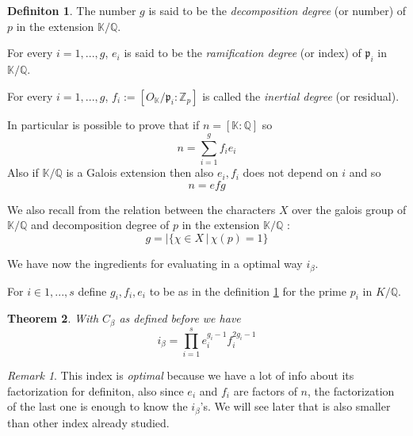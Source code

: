 \documentclass[]{article}
\theoremstyle{plain}
\newtheorem{teo}{Theorem}[section]
\theoremstyle{remark}
\newtheorem{rem}{Remark}
\theoremstyle{definition}
\newtheorem{deff}[teo]{Definiton}
\newcommand{\Z}{\mathbb{Z}}
\newcommand{\K}{\mathbb{K}}
\newcommand{\Q}{\mathbb{Q}}
\begin{document}
	\begin{deff} \label{def:degree}
		The number $ g $ is said to be the \textit{decomposition degree} (or number) of $ p $ in the extension $ \K / \Q $.
		
		For every $ i=1, ..., g $, $ e_i $ is said to be the \textit{ramification degree} (or index) of $ \mathfrak{p}_i $ in $ \K / \Q $.
		
		For every $ i=1, ..., g $, $ f_i := [O_\K / \mathfrak{p}_i  : \Z_p ] $ is called the \textit{inertial degree} (or residual). 
	\end{deff}
	
	In particular is possible to prove that if $ n= [\K : \Q] $ so \[n = \sum_{i=1}^g f_i e_i\] Also if $ \K / \Q $ is a Galois extension then also $ e_i, f_i $ does not depend on $ i $ and so \[ n = efg \]
	
	We also recall from \cite[Theorem~3.7]{CF} the relation between the characters $ X $ over the galois group of $ \K/\Q $ and decomposition degree of $ p $ in the extension $ \K / \Q $ :
	\begin{equation}\label{eq:g_char}
		g = | \{ \chi \in X \,|\, \chi(p)=1 \}
	\end{equation}
	
	
	We have now the ingredients for evaluating in a optimal way $ i_\beta $. 
	
	For $ i\in {1 , ... , s} $ define $ g_i , f_i , e_i $ to be as in the definition \ref{def:degree} for the prime $ p_i$ in $ K /\Q $.
	
	\begin{tcolorbox}
		\begin{teo} \label{teo:idx_opt}
			With $ C_\beta $ as defined before we have 
			\[ i_\beta  =  \prod_{i=1}^s e_i^{g_i - 1} f_i ^{2 g_i - 1}\]
		\end{teo}
	\end{tcolorbox}
	
	\begin{rem}
		This index is \textit{optimal} because we have a lot of info about its factorization for definiton, also since $ e_i $ and $ f_i $ are factors of $ n $, the factorization of the last one is enough to know the $ i_\beta $'s. We will see later that is also smaller than other index already studied. 
	\end{rem}
	
\end{document}

